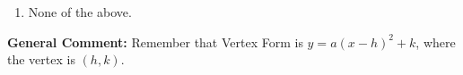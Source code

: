 \documentclass{extbook}[14pt]
\begin{document}
\begin{enumerate}
{\begin{enumerate}[label=\Alph*.]
\begin{multicols}{2}
\end{multicols}\item None of the above.\end{enumerate}
\textbf{General Comment:} Remember that Vertex Form is $y = a(x-h)^2+k$, where the vertex is $(h, k)$.
}
\end{enumerate}
\end{document}
